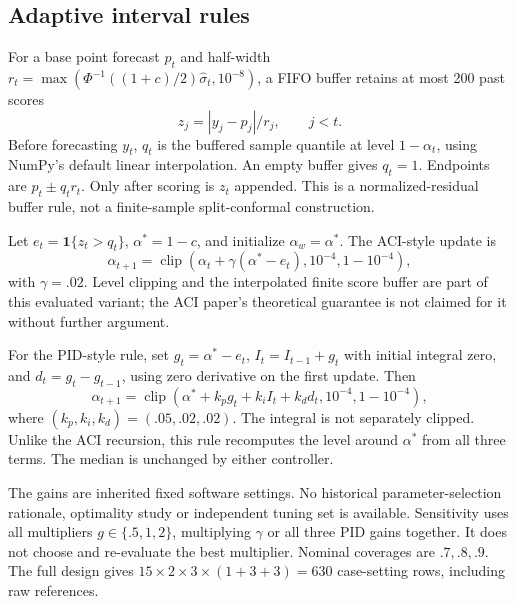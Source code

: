 \documentclass[11pt,a4paper]{article}
\begin{document}
\subsection{Adaptive interval rules}
For a base point forecast $p_t$ and half-width $r_t=\max(\Phi^{-1}((1+c)/2)\hat\sigma_t,10^{-8})$, a FIFO buffer retains at most 200 past scores
\begin{equation}
z_j=|y_j-p_j|/r_j,\qquad j<t.
\end{equation}
Before forecasting $y_t$, $q_t$ is the buffered sample quantile at level $1-\alpha_t$, using NumPy's default linear interpolation. An empty buffer gives $q_t=1$. Endpoints are $p_t\pm q_t r_t$. Only after scoring is $z_t$ appended. This is a normalized-residual buffer rule, not a finite-sample split-conformal construction.

Let $e_t=\mathbf1\{z_t>q_t\}$, $\alpha^*=1-c$, and initialize $\alpha_w=\alpha^*$. The ACI-style update is
\begin{equation}
\alpha_{t+1}=\operatorname{clip}(\alpha_t+\gamma(\alpha^*-e_t),10^{-4},1-10^{-4}),
\end{equation}
with $\gamma=.02$. Level clipping and the interpolated finite score buffer are part of this evaluated variant; the ACI paper's theoretical guarantee is not claimed for it without further argument.

For the PID-style rule, set $g_t=\alpha^*-e_t$, $I_t=I_{t-1}+g_t$ with initial integral zero, and $d_t=g_t-g_{t-1}$, using zero derivative on the first update. Then
\begin{equation}
\alpha_{t+1}=\operatorname{clip}(\alpha^*+k_pg_t+k_iI_t+k_dd_t,10^{-4},1-10^{-4}),
\end{equation}
where $(k_p,k_i,k_d)=(.05,.02,.02)$. The integral is not separately clipped. Unlike the ACI recursion, this rule recomputes the level around $\alpha^*$ from all three terms. The median is unchanged by either controller.

The gains are inherited fixed software settings. No historical parameter-selection rationale, optimality study or independent tuning set is available. Sensitivity uses all multipliers $g\in\{.5,1,2\}$, multiplying $\gamma$ or all three PID gains together. It does not choose and re-evaluate the best multiplier. Nominal coverages are $.7,.8,.9$. The full design gives $15\times2\times3\times(1+3+3)=630$ case-setting rows, including raw references.


\end{document}
